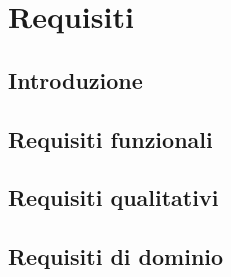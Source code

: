 \section{Requisiti}
\subsection{Introduzione}
\subsection{Requisiti funzionali}
\subsection{Requisiti qualitativi}
\subsection{Requisiti di dominio}
